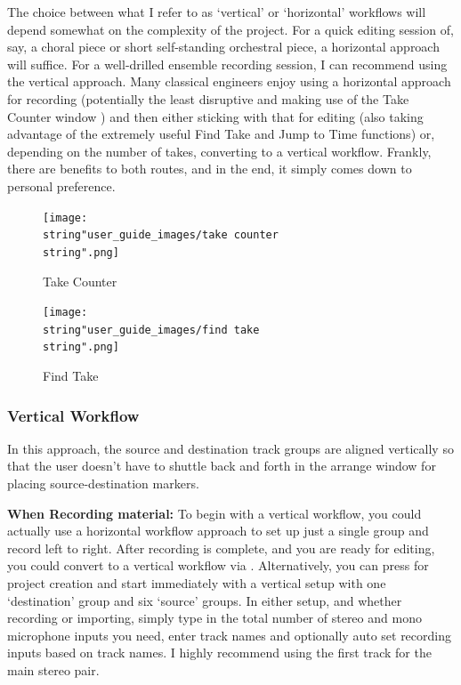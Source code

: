 \documentclass[10pt,american]{article}
\begin{document}
The choice between what I refer to as `vertical' or `horizontal' workflows will
depend somewhat on the complexity of the project. For a quick editing session
of, say, a choral piece or short self-standing orchestral piece, a horizontal
approach will suffice. For a well-drilled ensemble recording session, I can
recommend using the vertical approach. Many classical engineers enjoy using a
horizontal approach for recording (potentially the least disruptive and making
use of the Take Counter window ) and then either sticking
with that for editing (also taking advantage of the extremely useful Find Take
\keys{\return} and Jump to Time \keys{\tab} functions) or, depending on the
number of takes, converting to a vertical workflow. Frankly, there are benefits
to both routes, and in the end, it simply comes down to personal preference.

\begin{figure}
\begin{centering}
\texttt{[image: \\string"user\_guide\_images/take counter\\string".png]}
\par\end{centering}
\caption{Take Counter }

\end{figure}

\begin{figure}
\begin{centering}
\texttt{[image: \\string"user\_guide\_images/find take\\string".png]}
\par\end{centering}
\caption{Find Take }

\end{figure}


\subsubsection{Vertical Workflow}

In this approach, the source and destination track groups are aligned vertically
so that the user doesn't have to shuttle back and forth in the arrange window
for placing source-destination markers. 

\textbf{When Recording material:} To begin with a vertical workflow, you could
actually use a horizontal workflow approach  to set up just a single
group and record left to right. After recording is complete, and you are ready
for editing, you could convert to a vertical workflow via .
Alternatively, you can press  for project creation and start
immediately with a vertical setup with one `destination' group and six `source'
groups. In either setup, and whether recording or importing, simply type in the
total number of stereo and mono microphone inputs you need, enter track names
and optionally auto set recording inputs based on track names. I highly
recommend using the first track for the main stereo pair. 
\end{document}
